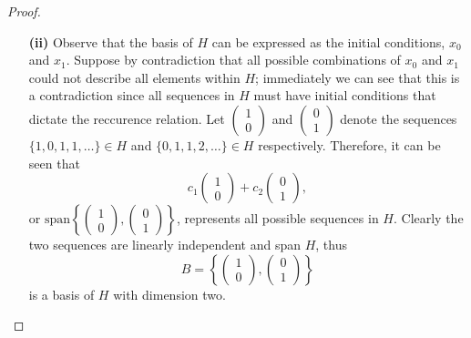 \documentclass[ 12pt ]{article}
\begin{document}
\begin{enumerate}
\begin{proof}
\begin{enumerate}
				\item[\textbf{(ii)}] Observe that the basis of $H$ can be expressed as the initial conditions, $x_0$ and $x_1$. Suppose by contradiction that all possible combinations
					of $x_0$ and $x_1$ could not describe all elements within $H$; immediately we can see that this is a contradiction since all sequences in $H$ must have initial
					conditions that dictate the reccurence relation. Let $\left ( \begin{smallmatrix} 1 \\ 0 \end{smallmatrix} \right )$ and $\left ( \begin{smallmatrix} 0 \\ 1
					\end{smallmatrix} \right )$ denote the sequences $\{ 1, 0, 1, 1, \hdots \} \in H$ and $\{ 0, 1, 1, 2, \hdots \} \in H$ respectively.
					Therefore, it can be seen that $$c_1\begin{pmatrix} 1 \\ 0 \end{pmatrix}+ c_2\begin{pmatrix} 0 \\ 1 \end{pmatrix},$$ or
					$\mathrm{span}\left \{  \left ( \begin{smallmatrix} 1 \\ 0 \end{smallmatrix} \right ), \left ( \begin{smallmatrix} 0 \\ 1 \end{smallmatrix} \right ) \right \}$, represents
					all possible sequences in $H$. Clearly the two sequences are linearly independent and span $H$, thus $$B = \left \{ \begin{pmatrix} 1 \\ 0 \end{pmatrix},
					\begin{pmatrix} 0 \\ 1 \end{pmatrix} \right \}$$ is a basis of $H$ with dimension two.


\end{enumerate}
\end{proof}
\end{enumerate}
\end{document}
